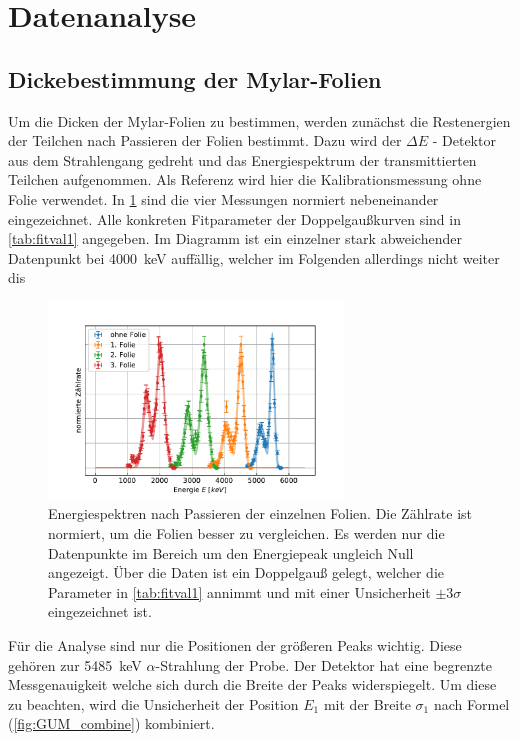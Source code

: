 \section{Datenanalyse}

\subsection{Dickebestimmung der Mylar-Folien}
\label{sec:dicke}

Um die Dicken der Mylar-Folien zu bestimmen, werden zunächst die Restenergien der Teilchen nach Passieren der Folien bestimmt.
Dazu wird der $\Delta E$ - Detektor aus dem Strahlengang gedreht und das Energiespektrum der transmittierten Teilchen aufgenommen.
Als Referenz wird hier die Kalibrationsmessung ohne Folie verwendet.
In \cref{fig:foliendicke} sind die vier Messungen normiert nebeneinander eingezeichnet.
Alle konkreten Fitparameter der Doppelgaußkurven sind in \cref{tab:fitval1} angegeben.
Im Diagramm ist ein einzelner stark abweichender Datenpunkt bei \SI{4000}{\kilo\electronvolt} auffällig, welcher im Folgenden allerdings nicht weiter dis

\begin{figure}[ht]
	\centering
	\includegraphics[width=0.7\textwidth]{dat/m3_foliendicke.pdf}
	\caption{Energiespektren nach Passieren der einzelnen Folien.
			Die Zählrate ist normiert, um die Folien besser zu vergleichen.
			Es werden nur die Datenpunkte im Bereich um den Energiepeak ungleich Null angezeigt.
			Über die Daten ist ein Doppelgauß gelegt, welcher die Parameter in \cref{tab:fitval1} annimmt und mit einer Unsicherheit $\pm 3 \sigma$ eingezeichnet ist.}
	\label{fig:foliendicke}
\end{figure}

Für die Analyse sind nur die Positionen der größeren Peaks wichtig.
Diese gehören zur \SI{5485}{\kilo\electronvolt} $\alpha$-Strahlung der Probe.
Der Detektor hat eine begrenzte Messgenauigkeit welche sich durch die Breite der Peaks widerspiegelt.
Um diese zu beachten, wird die Unsicherheit der Position $E_1$ mit der Breite $\sigma_1$ nach Formel (\ref{fig:GUM_combine}) kombiniert.

